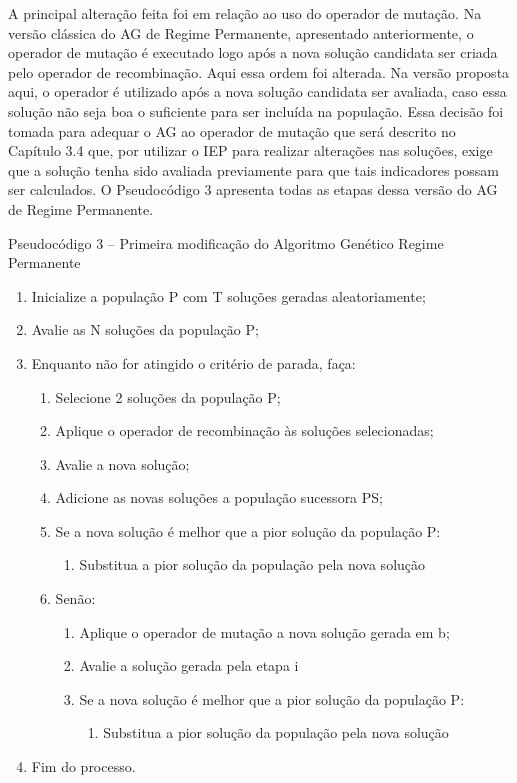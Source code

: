 A principal alteração feita foi em relação ao uso do operador de mutação. Na versão clássica do AG de Regime Permanente, apresentado anteriormente, o operador de mutação é executado logo após a nova solução candidata ser criada pelo operador de recombinação. Aqui essa ordem foi alterada. Na versão proposta aqui, o operador é utilizado após a nova solução candidata ser avaliada, caso essa solução não seja boa o suficiente para ser incluída na população. Essa decisão foi tomada para adequar o AG ao operador de mutação que será descrito no Capítulo 3.4 que, por utilizar o IEP para realizar alterações nas soluções, exige que a solução tenha sido avaliada previamente para que tais indicadores possam ser calculados. O Pseudocódigo 3 apresenta todas as etapas dessa versão do AG de Regime Permanente.

Pseudocódigo 3 – Primeira modificação do Algoritmo Genético Regime Permanente 

\begin{enumerate}
\item Inicialize a população P com T soluções geradas aleatoriamente;
\item Avalie as N soluções da população P;
\item Enquanto não for atingido o critério de parada, faça:

 \begin{enumerate}

\item Selecione 2 soluções da população P;
\item Aplique o operador de recombinação às soluções selecionadas;

\item Avalie a nova solução;
\item Adicione as novas soluções a população sucessora PS;
\item Se a nova solução é melhor que a pior solução da população P:
  \begin{enumerate}
\item Substitua a pior solução da população pela nova solução

\end{enumerate}
\item Senão:	
  \begin{enumerate}
\item Aplique o operador de mutação a nova solução gerada em b;
\item Avalie a solução gerada pela etapa i
\item Se a nova solução é melhor que a pior solução da população P: 
  \begin{enumerate}
\item Substitua a pior solução da população pela nova solução
\end{enumerate}
\end{enumerate}
\end{enumerate}
\item Fim do processo.

\end{enumerate}

